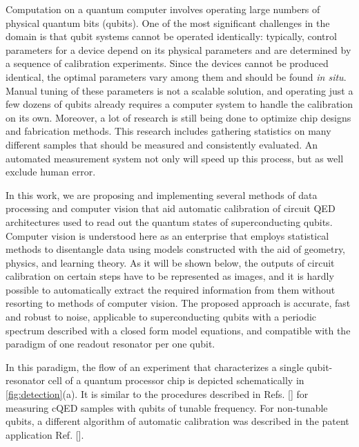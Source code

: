 \documentclass[%
 aip,
 draft,
 amsmath,amssymb,
 reprint,%
]{revtex4-1}
\begin{document}
Computation on a quantum computer involves operating large numbers of physical quantum bits (qubits). One of the most significant challenges in the domain is that qubit systems cannot be operated identically:\cite{kelly2018, chen2018} typically, control parameters for a device depend on its physical parameters and are determined by a sequence of calibration experiments. Since the devices cannot be produced identical, the optimal parameters vary among them and should be found \textit{in situ}. Manual tuning of these parameters is not a scalable solution, and operating just a few dozens of qubits already requires a computer system to handle the calibration on its own. Moreover, a lot of research is still being done to optimize chip designs and fabrication methods. This research includes gathering statistics on many different samples that should be measured and consistently evaluated. An automated measurement system not only will speed up this process, but as well exclude human error.

In this work, we are proposing and implementing several methods of data processing and computer vision that aid automatic calibration of circuit QED\cite{blais2007} architectures used to read out the quantum states of superconducting qubits. Computer vision is understood here as an enterprise that employs statistical methods to disentangle data using models constructed with the aid of geometry, physics, and learning theory.\cite{forsyth2011} As it will be shown below, the outputs of circuit calibration on certain steps have to be represented as images, and it is hardly possible to automatically extract the required information from them without resorting to methods of computer vision. The proposed approach is accurate, fast and robust to noise, applicable to superconducting qubits with a periodic spectrum described with a closed form model equations, and compatible with the paradigm of one readout resonator per one qubit.\cite{versluis2017, kelly2015}

In this paradigm, the flow of an experiment that characterizes a single qubit-resonator cell of a quantum processor chip is depicted schematically in \autoref{fig:detection}(a). It is similar to the  procedures described in Refs. [] for measuring cQED samples with qubits of tunable frequency. For non-tunable qubits, a different algorithm of automatic calibration was described in the patent application Ref. []. 
\end{document}
